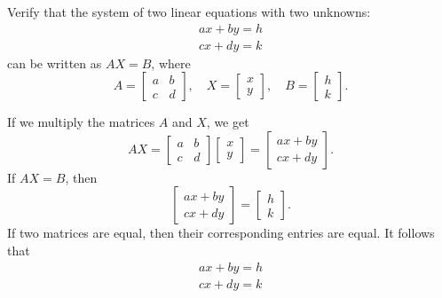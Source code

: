 \begin{example}
    Verify that the system of two linear equations with two unknowns:
    \begin{align*}
        ax + by = h \\
        cx + dy = k
    \end{align*}
    can be written as $AX = B$, where
    \[
        A = \begin{bmatrix}
            a & b \\
            c & d
        \end{bmatrix}, \quad
        X = \begin{bmatrix}
            x \\
            y
        \end{bmatrix}, \quad
        B = \begin{bmatrix}
            h \\
            k
        \end{bmatrix}.
    \]
\end{example}

\begin{solution}
    If we multiply the matrices $A$ and $X$, we get
    \[
        AX = \begin{bmatrix}
            a & b \\
            c & d
        \end{bmatrix}
        \begin{bmatrix}
            x \\
            y
        \end{bmatrix}
        = \begin{bmatrix}
            ax + by \\
            cx + dy
        \end{bmatrix}.
    \]
    If $AX = B$, then
    \[
        \begin{bmatrix}
            ax + by \\
            cx + dy
        \end{bmatrix}
        = \begin{bmatrix}
            h \\
            k
        \end{bmatrix}.
    \]
    If two matrices are equal, then their corresponding entries are equal. It follows that
    \begin{align*}
        ax + by = h \\
        cx + dy = k
    \end{align*}
\end{solution}


